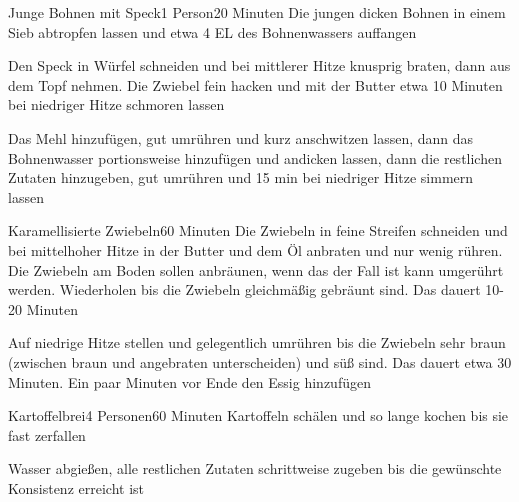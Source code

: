
\begin{recipe}{Junge Bohnen mit Speck}{1 Person}{20 Minuten}
Die jungen dicken Bohnen in einem Sieb abtropfen lassen und etwa 4 EL des Bohnenwassers auffangen

Den Speck in Würfel schneiden und bei mittlerer Hitze knusprig braten, dann aus dem Topf nehmen.
Die Zwiebel fein hacken und mit der Butter etwa 10 Minuten bei niedriger Hitze schmoren lassen

Das Mehl hinzufügen, gut umrühren und kurz anschwitzen lassen, dann das Bohnenwasser portionsweise hinzufügen und andicken lassen, dann die restlichen Zutaten hinzugeben, gut umrühren und 15 min bei niedriger Hitze simmern lassen
\end{recipe}


\begin{recipe}{Karamellisierte Zwiebeln}{}{60 Minuten}
Die Zwiebeln in feine Streifen schneiden und bei mittelhoher Hitze in der Butter und dem Öl anbraten und nur wenig rühren. Die Zwiebeln am Boden sollen anbräunen, wenn das der Fall ist kann umgerührt werden. Wiederholen bis die Zwiebeln gleichmäßig gebräunt sind. Das dauert 10-20 Minuten

Auf niedrige Hitze stellen und gelegentlich umrühren bis die Zwiebeln sehr braun (zwischen braun und angebraten unterscheiden) und süß sind. Das dauert etwa 30 Minuten. Ein paar Minuten vor Ende den Essig hinzufügen
\end{recipe}


\begin{recipe}{Kartoffelbrei}{4 Personen}{60 Minuten}
Kartoffeln schälen und so lange kochen bis sie fast zerfallen

Wasser abgießen, alle restlichen Zutaten schrittweise zugeben bis die gewünschte Konsistenz erreicht ist
\end{recipe}

